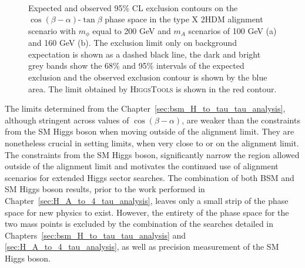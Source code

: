 \begin{figure}[!hbtp]
\centering
     \\
\caption{Expected and observed 95\% CL exclusion contours on the $\cos(\beta-\alpha)$-$\tan\beta$ phase space in the type X 2HDM alignment scenario with $m_{\phi}$ equal to 200 GeV and $m_{A}$ scenarios of 100 GeV (a) and 160 GeV (b). The exclusion limit only on background expectation is shown as a dashed black line, the dark and bright grey bands show the 68\% and 95\% intervals of the expected exclusion and the observed exclusion contour is shown by the blue area. The limit obtained by \textsc{HiggsTools} is shown in the red contour.}
\label{fig:4tau_cosbma_hb}
\end{figure}

The limits determined from the Chapter~\ref{sec:bsm_H_to_tau_tau_analysis}, although stringent across values of $\cos(\beta-\alpha)$, are weaker than the constraints from the \ac{SM} Higgs boson when moving outside of the alignment limit.
They are nonetheless crucial in setting limits, when very close to or on the alignment limit.
The constraints from the \ac{SM} Higgs boson, significantly narrow the region allowed outside of the alignment limit and motivates the continued use of alignment scenarios for extended Higgs sector searches.
The combination of both \ac{BSM} and \ac{SM} Higgs boson results, prior to the work performed in Chapter~\ref{sec:H_A_to_4_tau_analysis}, leaves only a small strip of the phase space for new physics to exist.
However, the entirety of the phase space for the two mass points is excluded by the combination of the searches detailed in Chapters~\ref{sec:bsm_H_to_tau_tau_analysis} and \ref{sec:H_A_to_4_tau_analysis}, as well as precision measurement of the \ac{SM} Higgs boson.

